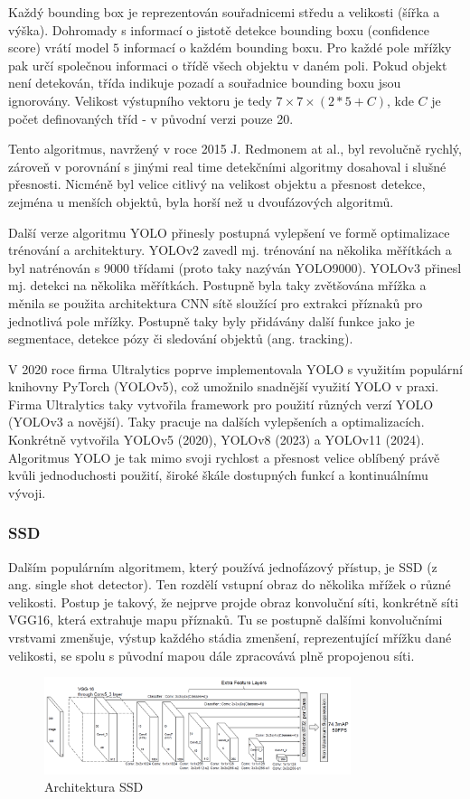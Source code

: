 Každý bounding box je reprezentován souřadnicemi středu a velikosti (šířka a
výška). Dohromady s informací o jistotě detekce bounding boxu (confidence
score) vrátí model $5$ informací o každém bounding boxu. Pro každé pole mřížky
pak určí společnou informaci o třídě všech objektu v daném poli. Pokud objekt
není detekován, třída indikuje pozadí a souřadnice bounding boxu jsou
ignorovány. Velikost výstupního vektoru je tedy $7 \times 7 \times (2 * 5 +
    C)$, kde $C$ je počet definovaných tříd - v původní verzi pouze 20.

Tento algoritmus, navržený v roce 2015 J. Redmonem at al., byl revolučně
rychlý, zároveň v porovnání s jinými real time detekčními algoritmy dosahoval i
slušné přesnosti. Nicméně byl velice citlivý na velikost objektu a přesnost
detekce, zejména u menších objektů, byla horší než u dvoufázových algoritmů.

Další verze algoritmu YOLO přinesly postupná vylepšení ve formě optimalizace
trénování a architektury. YOLOv2 \cite{yolo9000} zavedl mj. trénování na
několika měřítkách a byl natrénován s 9000 třídami (proto taky nazýván
YOLO9000). YOLOv3 \cite{yolov3} přinesl mj. detekci na několika měřítkách.
Postupně byla taky zvětšována mřížka a měnila se použita architektura CNN sítě
sloužící pro extrakci příznaků pro jednotlivá pole mřížky. Postupně taky byly
přidávány další funkce jako je segmentace, detekce pózy či sledování objektů
(ang. tracking).

V 2020 roce firma Ultralytics poprve implementovala YOLO s využitím populární
knihovny PyTorch (YOLOv5), což umožnilo snadnější využití YOLO v praxi. Firma
Ultralytics taky vytvořila framework pro použití různých verzí YOLO (YOLOv3 a
novější). Taky pracuje na dalších vylepšeních a optimalizacích. Konkrétně
vytvořila YOLOv5 (2020), YOLOv8 (2023) a YOLOv11 (2024). Algoritmus YOLO je tak
mimo svoji rychlost a přesnost velice oblíbený právě kvůli jednoduchosti
použití, široké škále dostupných funkcí a kontinuálnímu vývoji.

\subsubsection{SSD}
Dalším populárním algoritmem, který používá jednofázový přístup, je SSD (z ang.
single shot detector). \cite{szegedy:ssd} Ten rozdělí vstupní obraz do několika
mřížek o různé velikosti. Postup je takový, že nejprve projde obraz konvoluční
síti, konkrétně síti VGG16, která extrahuje mapu příznaků. Tu se postupně
dalšími konvolučními vrstvami zmenšuje, výstup každého stádia zmenšení,
reprezentující mřížku dané velikosti, se spolu s původní mapou dále zpracovává
plně propojenou síti.
\begin{figure}[]
    \centering
    \includegraphics[width=0.8\textwidth]{Figures/ssd.png}
    \caption{Architektura SSD \cite{szegedy:ssd}}
    \label{fig:ssd}
\end{figure}

